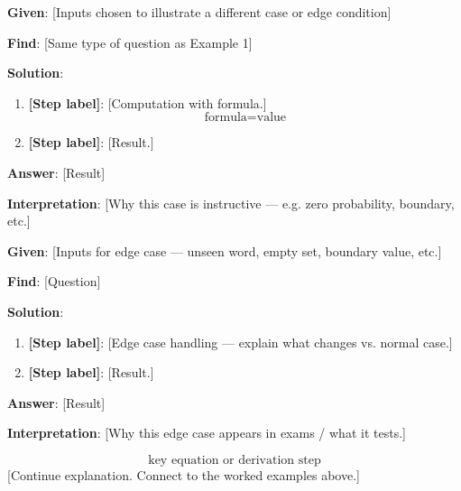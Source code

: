 \begin{tcolorbox}[colback=green!5!white,colframe=green!75!black,
    title=\textbf{Worked Example 2: [Title] (constructed — different inputs, same method)}]

\textbf{Given}: [Inputs chosen to illustrate a different case or edge condition]

\textbf{Find}: [Same type of question as Example 1]

\textbf{Solution}:
\begin{enumerate}
    \item \textbf{[Step label]}: [Computation with formula.]
    \[
        \text{formula} = \text{value}
    \]
    \item \textbf{[Step label]}: [Result.]
\end{enumerate}

\textbf{Answer}: [Result]

\textbf{Interpretation}: [Why this case is instructive — e.g. zero probability, boundary, etc.]
\end{tcolorbox}

\begin{tcolorbox}[colback=green!5!white,colframe=green!75!black,
    title=\textbf{Worked Example 3: [Edge Case Title] (constructed)}]

\textbf{Given}: [Inputs for edge case — unseen word, empty set, boundary value, etc.]

\textbf{Find}: [Question]

\textbf{Solution}:
\begin{enumerate}
    \item \textbf{[Step label]}: [Edge case handling — explain what changes vs. normal case.]
    \item \textbf{[Step label]}: [Result.]
\end{enumerate}

\textbf{Answer}: [Result]

\textbf{Interpretation}: [Why this edge case appears in exams / what it tests.]
\end{tcolorbox}

\begin{tcolorbox}
\[
    \text{key equation or derivation step}
\]
[Continue explanation. Connect to the worked examples above.]
\end{tcolorbox}

